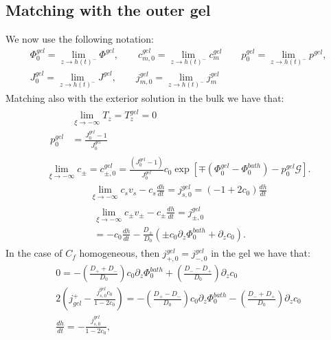 \documentclass[12pt]{extarticle}
\begin{document}
\subsection{Matching with the outer gel}
We now use the following notation:
\begin{equation}
\begin{aligned}
\Phi^{gel}_0=\lim_{z\rightarrow h(t)^-} \Phi^{gel}, \qquad c^{gel}_{m,0}=\lim_{z\rightarrow h(t)^-} c^{gel}_{m} \qquad p_0^{gel}=\lim_{z\rightarrow h(t)^-} p^{gel},\\
J^{gel}_0=\lim_{z\rightarrow h(t)^-} J^{gel}, \qquad j^{gel}_{m,0}=\lim_{z\rightarrow h(t)^-} j^{gel}_m
\end{aligned}
\end{equation}
Matching also with the exterior solution in the bulk we have that:
\begin{gather}
\begin{aligned}
&\lim_{\xi\rightarrow -\infty} T_z = T^{gel}_z =0 \\
p^{gel}_0& = \frac{J^{gel}_0-1}{J^{gel}_0}\label{eq1}
\end{aligned}\\
\lim_{\xi\rightarrow -\infty} c_\pm = c^{gel}_{\pm,0} = \frac{(J^{gel}_0-1)}{J^{gel}_0}c_0\exp[\mp(\Phi^{gel}_0-\Phi_0^{bath})-p_0^{gel}\mathcal{G}].
\end{gather}
\begin{gather}
\lim_{\xi\rightarrow -\infty} c_s v_s - c_s \frac{dh}{dt}= j^{gel}_{s,0} =(-1+2c_0)\frac{dh}{dt}\\
\begin{aligned}
\lim_{\xi\rightarrow -\infty}c_\pm v_\pm - c_\pm \frac{dh}{dt}=j^{gel}_{\pm,0}\\
=-c_0 \frac{dh}{dt}  -\frac{D_\pm}{D_0}\left(\pm c_0 \partial_z \Phi^{bath}_0+\partial_z c_0\right).
\end{aligned}
\end{gather}
In the case of $C_f$ homogeneous, then $j^{gel}_{+,0}=j^{gel}_{-,0}$ in the gel we have that:
\begin{eqnarray}
0= - \left(\frac{D_++D_-}{D_0}\right)c_0\partial_z \Phi^{bath}_0 + \left(\frac{D_--D_+}{D_0}\right)\partial_z c_0\label{A}\\
2\left(j^+_{gel}-\frac{j_{s,0}^{gel}c_0}{1-2c_0}\right) =- \left(\frac{D_+-D_-}{D_0}\right)c_0\partial_z \Phi^{bath}_0 - \left(\frac{D_-+D_+}{D_0}\right)\partial_z c_0\label{B}\\
\frac{d h}{dt} = -\frac{j_{s,0}^{gel}}{1-2c_0},
\end{eqnarray}
\end{document}
